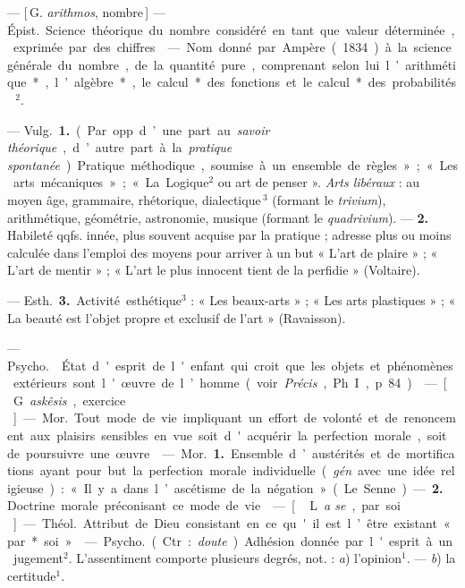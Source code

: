 \begin{itemize}[leftmargin=1cm, label=, itemsep=1pt]
{{ — [\,G. {\it arithmos}, nombre\,]
— \si{Épist.} Science théorique du
nombre considéré en tant que valeur
déterminée, exprimée par des chiffres.

 — Nom donné par Ampère (1834) à la science générale du
nombre, de la quantité pure, comprenant selon lui l’arithmétique*,
l’algèbre*, le calcul* des fonctions
et le calcul* des probabilités\,$^2$.

 — \si{Vulg.} {\bf 1.} (Par opp. d’une part
au {\it savoir théorique}, d’autre part à la
{\it pratique spontanée}). Pratique méthodique, soumise à un ensemble de
règles » ; « Les arts mécaniques » ;
« La Logique$^2$ ou art de penser ».
{\it Arts libéraux} : au moyen âge, grammaire,
rhétorique, dialectique\,$^3$ (formant le {\it trivium}), arithmétique, géométrie,
astronomie, musique (formant le {\it quadrivium}). — {\bf 2.} Habileté
qqfs. innée, plus souvent acquise
par la pratique ; adresse plus ou
moins calculée dans l'emploi des
moyens pour arriver à un but
« L'art de plaire » ; « L'art de mentir » ;
« L'art le plus innocent tient de la
perfidie » (Voltaire).

— \si{Esth.} {\bf 3.} Activité esthétique$^3$ :
« Les beaux-arts » ; « Les arts plastiques » ; « La beauté est l’objet
propre et exclusif de l’art » (Ravaisson).

 — \si{Psycho.}  État d'esprit
de l'enfant qui croit que les objets
et phénomènes extérieurs sont l'œuvre de l’homme (voir {\it Précis}, Ph. I,
p. 84).

 — [\,G. {\it askêsis}, exercice\,] — \si{Mor.}
Tout mode de vie impliquant un
effort de volonté et de renoncement
aux plaisirs sensibles en vue soit
d'acquérir la perfection morale, soit
de poursuivre une œuvre.

 — \si{Mor.} {\bf 1.} Ensemble d’austérités et de mortifications ayant
pour but la perfection morale individuelle ({\it gén}. avec une idée
religieuse) : « Il y a dans l’ascétisme de
la négation » (Le Senne). — {\bf 2.} 
Doctrine morale préconisant ce
mode de vie.

 — [\,L. {\it a se}, par soi\,] — \si{Théol.}
Attribut de Dieu consistant en ce
qu'il est l’être existant « par* soi ».

 — \si{Psycho.} (Ctr. : {\it doute}).
Adhésion donnée par l'esprit à un
jugement$^2$. L’assentiment comporte
plusieurs degrés, not. : {\it a}) l'opinion$^1$.
— {\it b}) la certitude$^1$.

}}
\end{itemize}
